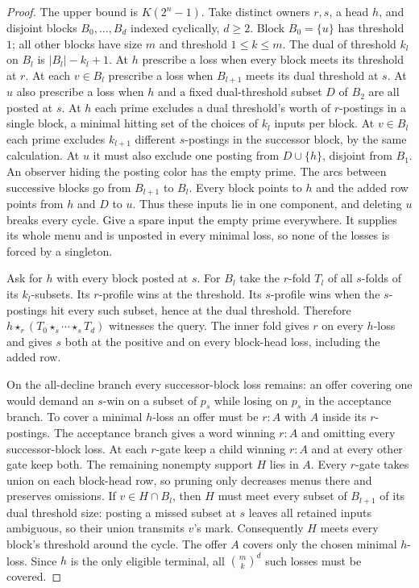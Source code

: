 \begin{proof}
The upper bound is $K(2^n-1)$. Take distinct owners $r,s$, a head
$h$, and disjoint blocks $B_0,\ldots,B_d$ indexed cyclically,
$d\ge2$. Block $B_0=\{u\}$ has threshold $1$; all other blocks
have size $m$ and threshold $1\le k\le m$. The dual of threshold
$k_l$ on $B_l$ is $|B_l|-k_l+1$. At $h$ prescribe a loss when
every block meets its threshold at $r$. At each $v\in B_l$
prescribe a loss when $B_{l+1}$ meets its dual threshold at $s$.
At $u$ also prescribe a loss when $h$ and a fixed dual-threshold
subset $D$ of $B_2$ are all posted at $s$. At $h$ each prime
excludes a dual threshold's worth of $r$-postings
in a single block, a minimal hitting set of the choices of $k_l$
inputs per block. At $v\in B_l$ each prime excludes $k_{l+1}$
different $s$-postings in the successor block, by the same calculation.
At $u$ it must also exclude one posting from $D\cup\{h\}$, disjoint
from $B_1$. An observer hiding the posting color has the empty prime.
The arcs between successive blocks go from $B_{l+1}$ to $B_l$.
Every block points to $h$ and the added row points from $h$ and $D$
to $u$. Thus these inputs lie in one component, and deleting $u$
breaks every cycle. Give a spare input the empty prime everywhere.
It supplies its whole menu and is unposted in every minimal loss,
so none of the losses is forced by a singleton.

Ask for $h$ with every block posted at $s$. For $B_l$ take the
$r$-fold $T_l$ of all $s$-folds of its $k_l$-subsets. Its
$r$-profile wins at the threshold. Its $s$-profile wins when the
$s$-postings hit every such subset, hence at the dual threshold.
Therefore $h\star_r(T_0\star_s\cdots\star_s T_d)$ witnesses the query.
The inner fold gives $r$ on every $h$-loss and gives $s$ both at
the positive and on every block-head loss, including the added row.

On the all-decline branch every successor-block loss remains: an offer
covering one would demand an $s$-win on a subset of $p_s$ while
losing on $p_s$ in the acceptance branch. To cover a minimal
$h$-loss an offer must be $r:A$ with $A$ inside its $r$-postings.
The acceptance branch gives a word winning $r:A$ and omitting every
successor-block loss. At each $r$-gate keep a child winning $r:A$ and at
every other gate keep both. The remaining nonempty support $H$ lies
in $A$. Every $r$-gate takes union on each block-head row, so pruning
only decreases menus there and preserves omissions. If $v\in
H\cap B_l$, then $H$ must meet every subset of $B_{l+1}$ of its
dual threshold size: posting a missed subset at $s$ leaves all
retained inputs ambiguous, so their union transmits $v$'s mark.
Consequently $H$ meets every block's threshold around the cycle. The offer $A$
covers only the chosen minimal $h$-loss. Since $h$ is the only
eligible terminal, all $\binom{m}{k}^{d}$ such losses must be covered.


\end{proof}
